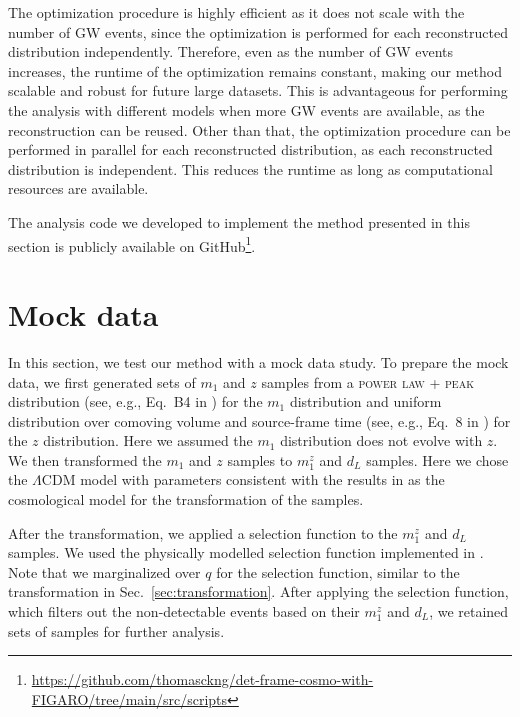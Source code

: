 \documentclass[sn-aps, pdflatex, iicol]{sn-jnl}
\begin{document}
The optimization procedure is highly efficient as it does not scale with the number of \ac{GW} events, since the optimization is performed for each reconstructed distribution independently.
Therefore, even as the number of \ac{GW} events increases, the runtime of the optimization remains constant, making our method scalable and robust for future large datasets.
This is advantageous for performing the analysis with different models when more \ac{GW} events are available, as the reconstruction can be reused.
Other than that, the optimization procedure can be performed in parallel for each reconstructed distribution, as each reconstructed distribution is independent.
This reduces the runtime as long as computational resources are available.

The analysis code we developed to implement the method presented in this section is publicly available on GitHub\footnote{ \url{https://github.com/thomasckng/det-frame-cosmo-with-FIGARO/tree/main/src/scripts}}.

\section{Mock data}
\label{sec:mock_data}

In this section, we test our method with a mock data study.
To prepare the mock data, we first generated  sets of $m_1$ and $z$ samples from a \textsc{power law + peak} distribution (see, e.g., Eq.~B4 in \cite{KAGRA:2021duu}) for the $m_1$ distribution and uniform distribution over comoving volume and source-frame time (see, e.g., Eq.~8 in \cite{KAGRA:2021duu}) for the $z$ distribution.
Here we assumed the $m_1$ distribution does not evolve with $z$.
We then transformed the $m_1$ and $z$ samples to $m^z_1$ and $d_L$ samples.
Here we chose the $\Lambda$CDM model with parameters consistent with the results in \cite{Planck:2018vyg} as the cosmological model for the transformation of the samples.

After the transformation, we applied a selection function to the $m^z_1$ and $d_L$ samples.
We used the physically modelled selection function implemented in \cite{Lorenzo-Medina:2024opt}.
Note that we marginalized over $q$ for the selection function, similar to the transformation in Sec.~\ref{sec:transformation}.
After applying the selection function, which filters out the non-detectable events based on their $m^z_1$ and $d_L$, we retained  sets of samples for further analysis.
\end{document}

